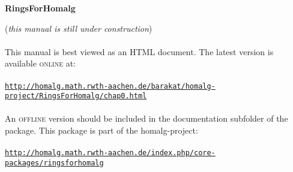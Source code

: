 \documentclass[a4paper,11pt]{report}
\newcommand{\maintitlesize}{\fontsize{50}{55}\selectfont}
\begin{document}
\begin{titlepage}
\begin{center}{\maintitlesize \textbf{\textsf{RingsForHomalg}\mbox{}}}
{    }
\mbox{}\\[2cm]
\begin{minipage}{12cm}\noindent
(\emph{this manual is still under construction}) \\
\\
 This manual is best viewed as an \textsc{HTML} document. The latest version is available \textsc{online} at: \\
\\
 \href{http://homalg.math.rwth-aachen.de/~barakat/homalg-project/RingsForHomalg/chap0.html} {\texttt{http://homalg.math.rwth-aachen.de/\texttt{}barakat/homalg-project/RingsForHomalg/chap0.html}} \\
\\
 An \textsc{offline} version should be included in the documentation subfolder of the package. This
package is part of the \textsf{homalg}-project: \\
\\
 \href{http://homalg.math.rwth-aachen.de/index.php/core-packages/ringsforhomalg} {\texttt{http://homalg.math.rwth-aachen.de/index.php/core-packages/ringsforhomalg}} \end{minipage}

\end{center}\vfill


\end{titlepage}
\end{document}
